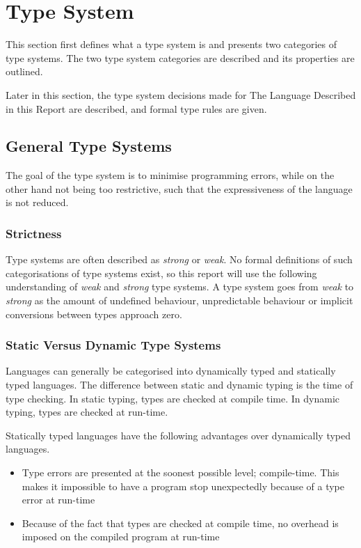 \section{Type System}\label{typesys}

This section first defines what a type system is and presents two categories of type systems. The two type system categories are described and its properties are outlined.

Later in this section, the type system decisions made for The Language Described in this Report are described, and formal type rules are given.

\subsection{General Type Systems}

The goal of the type system is to minimise programming errors, while on the other hand not being too restrictive, such that the expressiveness of the language is not reduced. 

\subsubsection{Strictness}
Type systems are often described as \emph{strong} or \emph{weak}. No formal definitions of such categorisations of type systems exist, so this report will use the following understanding of \emph{weak} and \emph{strong} type systems. A type system goes from \emph{weak} to \emph{strong} as the amount of undefined behaviour, unpredictable behaviour or implicit conversions between types approach zero.

\subsubsection{Static Versus Dynamic Type Systems}
Languages can generally be categorised into dynamically typed and statically typed languages. The difference between static and dynamic typing is the time of type checking. In static typing, types are checked at compile time. In dynamic typing, types are checked at run-time.

Statically typed languages have the following advantages over dynamically typed languages.

\begin{itemize}
  \item Type errors are presented at the soonest possible level; compile-time. This makes it impossible to have a program stop unexpectedly because of a type error at run-time
  \item Because of the fact that types are checked at compile time, no overhead is imposed on the compiled program at run-time
\end{itemize}

